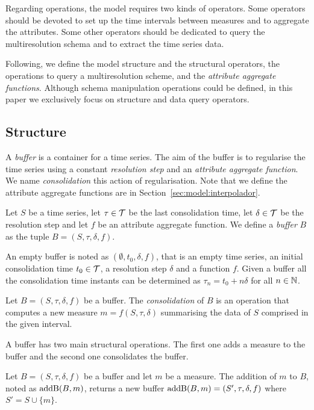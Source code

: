 Regarding operations, the  model requires two kinds of
operators. Some operators should be devoted to set up the time
intervals between measures and to aggregate the attributes. Some other
operators should be dedicated to query the multiresolution schema and
to extract the time series data.

Following, we define the  model structure and the
structural operators, the operations to query a multiresolution
scheme, and the \emph{attribute aggregate functions}.  Although schema
manipulation operations could be defined, in this paper we exclusively
focus on structure and data query operators.


\subsection{Structure}


A \emph{buffer} is a container for a time series. The aim of the
buffer is to regularise the time series using a constant
\emph{resolution step} and an \emph{attribute aggregate function}.  We
name \emph{consolidation} this action of regularisation.  Note that we
define the attribute aggregate functions are in
Section~\ref{sec:model:interpolador}.

\begin{definition}[Buffer]
  Let $S$ be a time series, let $\tau\in\cal{T}$ be the last
  consolidation time, let $\delta\in\cal{T}$ be the resolution step
  and let $f$ be an attribute aggregate function. We define a
  \emph{buffer} $B$ as the tuple $B=(S,\tau,\delta,f)$.
\end{definition}

An empty buffer is noted as $(\emptyset, t_0, \delta, f)$, that is an
empty time series, an initial consolidation time $t_0\in\cal{T}$, a
resolution step $\delta$ and a function $f$.  Given a buffer all the
consolidation time instants can be determined as $\tau_n=t_0+n\delta$
for all $n\in\mathbb{N}$.

Let $B=(S, \tau, \delta, f)$ be a buffer. The \emph{consolidation} of
$B$ is an operation that computes a new measure $m=f(S, \tau, \delta)$
summarising the data of $S$ comprised in the given interval.

A buffer has two main structural operations. The first one adds a
measure to the buffer and the second one consolidates the buffer.

Let $B=(S,\tau,\delta,f)$ be a buffer and let $m$ be a measure.  The
addition of $m$ to $B$, noted as $\operatorname{addB}(B,m)$, returns a new buffer
$\operatorname{addB}(B,m)=(S',\tau,\delta,f)$ where $S' = S \cup \{m\}$.

